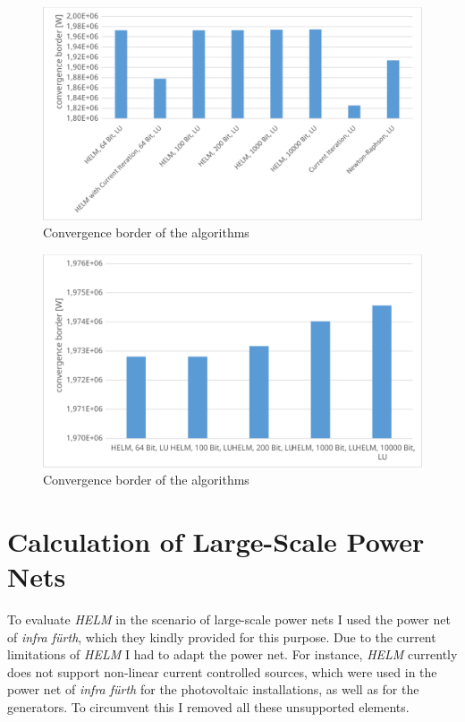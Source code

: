 \begin{figure}
	\centering
	\includegraphics[scale=0.7]{figures/convergence_border_vorstadtnetz_2}
	\caption[Comparison, convergence]{Convergence border of the algorithms}
	\label{fig:comparison_convergence_border_2}
\end{figure}

\begin{figure}
	\centering
	\includegraphics[scale=0.7]{figures/convergence_border_vorstadtnetz_3}
	\caption[Comparison, convergence]{Convergence border of the algorithms}
	\label{fig:comparison_convergence_border_3}
\end{figure}

\section{Calculation of Large-Scale Power Nets}
\label{sec:large_scale_power nets}
	
To evaluate \emph{HELM} in the scenario of large-scale power nets I used the power net of \emph{infra fürth}, which they kindly provided for this purpose. Due to the current limitations of \emph{HELM} I had to adapt the power net. For instance, \emph{HELM} currently does not support non-linear current controlled sources, which were used in the power net of \emph{infra fürth} for the photovoltaic installations, as well as for the generators. To circumvent this I removed all these unsupported elements.

